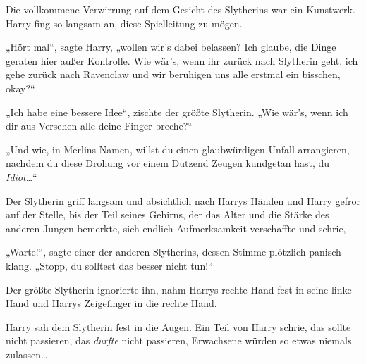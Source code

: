 Die vollkommene Verwirrung auf dem Gesicht des Slytherins war ein Kunstwerk. Harry fing so langsam an, diese Spielleitung zu mögen.

„Hört mal“, sagte Harry, „wollen wir’s dabei belassen? Ich glaube, die Dinge geraten hier außer Kontrolle. Wie wär’s, wenn ihr zurück nach Slytherin geht, ich gehe zurück nach Ravenclaw und wir beruhigen uns alle erstmal ein bisschen, okay?“

„Ich habe eine bessere Idee“, zischte der größte Slytherin. „Wie wär’s, wenn ich dir aus Versehen alle deine Finger breche?“

„Und wie, in Merlins Namen, willst du einen glaubwürdigen Unfall arrangieren, nachdem du diese Drohung vor einem Dutzend Zeugen kundgetan hast, du \emph{Idiot}…“

Der Slytherin griff langsam und absichtlich nach Harrys Händen und Harry gefror auf der Stelle, bis der Teil seines Gehirns, der das Alter und die Stärke des anderen Jungen bemerkte, sich endlich Aufmerksamkeit verschaffte und schrie, 

„Warte!“, sagte einer der anderen Slytherins, dessen Stimme plötzlich panisch klang. „Stopp, du solltest das besser nicht tun!“

Der größte Slytherin ignorierte ihn, nahm Harrys rechte Hand fest in seine linke Hand und Harrys Zeigefinger in die rechte Hand.

Harry sah dem Slytherin fest in die Augen. Ein Teil von Harry schrie, das sollte nicht passieren, das \emph{durfte} nicht passieren, Erwachsene würden so etwas niemals zulassen…

